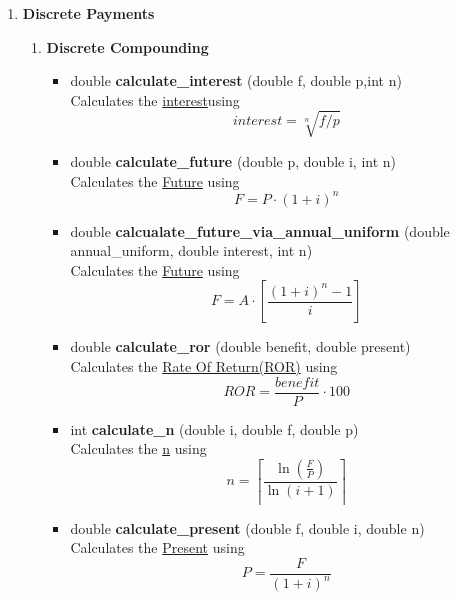 \documentclass[english,12pt,a4paper,twoside,titlepage,leqno,fleqn]{article}
\begin{document}
\begin{enumerate}
	\item {\bfseries Discrete Payments }\vspace{1cm}
	\begin{enumerate}
		\item {\bfseries Discrete Compounding}\vspace{1cm}
\begin{itemize}

\item double {\bfseries calculate\_interest} \small{(double f, double p,int n)}\\
Calculates the \underline{interest}using\vspace{1cm} \[interest = \sqrt[n]{f/p}\]\vspace{1cm}

\item double {\bfseries calculate\_future} \small{(double p, double i, int n)}\\
Calculates the \underline{Future} using\vspace{1cm} \[F = P\cdot(1+i)^{n}\]
\vspace{1cm}

\item double {\bfseries calcualate\_future\_via\_annual\_uniform} \small{(double annual\_uniform, double interest, int n)}\\
Calculates the \underline{Future} using\vspace{1cm} \[F = A\cdot\left[\frac{(1+i)^{n}-1}{i}\right] \]\vspace{1cm}

\item double {\bfseries calculate\_ror } \small{(double benefit, double present)}\\
Calculates the \underline{Rate Of Return(ROR)} using\vspace{1cm} \[ROR = \frac{benefit}{P}\cdot100 \]\vspace{1cm}

\item int {\bfseries calculate\_n } \small{(double i, double f, double p)}\\
Calculates the \underline{n} using\vspace{1cm} \[n = \left\lceil\frac {\ln(\frac{F}{P})}{\ln(i+1)}\right\rceil \]\vspace{1cm}

\item double {\bfseries calculate\_present} \small{(double f, double i, double n)}\\
Calculates the \underline{Present} using\vspace{1cm} \[P = \frac{F}{(1+i)^{n}}\]\vspace{1cm}


\end{itemize}
\end{enumerate}
\end{enumerate}
\end{document}
